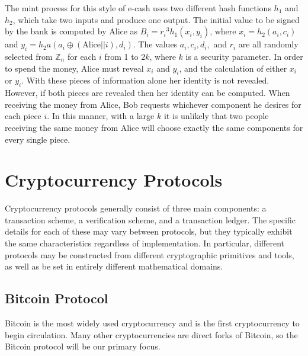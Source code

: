 \documentclass[11pt]{article}
\begin{document}
The mint process for this style of e-cash uses two different hash functions $h_1$ and $h_2$, which take two inputs and
produce one output. The initial value to be signed by the bank is computed by Alice as $B_i = {r_i}^3h_1(x_i,y_i)$, where
$x_i=h_2(a_i,c_i)$ and $y_i=h_2a(a_i \oplus (\textrm{Alice} || i), d_i)$. The values $a_i, c_i, d_i,$ and $r_i$ are all
randomly selected from $\mathbb{Z}_n$ for each $i$ from 1 to $2k$, where $k$ is a security parameter. In order to spend
the money, Alice must reveal $x_i$ and $y_i$, and the calculation of either $x_i$ or $y_i$. With these pieces of
information alone her identity is not revealed. However, if both pieces are revealed then her identity can be computed.
When receiving the money from Alice, Bob requests whichever component he desires for each piece $i$. In this manner,
with a large $k$ it is unlikely that two people receiving the same money from Alice will choose exactly the same
components for every single piece.

\section{Cryptocurrency Protocols}
Cryptocurrency protocols generally consist of three main components: a transaction scheme, a verification scheme, and a
transaction ledger. The specific details for each of these may vary between protocols, but they typically exhibit the
same characteristics regardless of implementation. In particular, different protocols may be constructed from different
cryptographic primitives and tools, as well as be set in entirely different mathematical domains.

\subsection{Bitcoin Protocol} Bitcoin is the most widely used cryptocurrency and is the first cryptocurrency to begin
circulation. Many other cryptocurrencies are direct forks of Bitcoin, so the Bitcoin protocol will be our primary focus.
\end{document}
